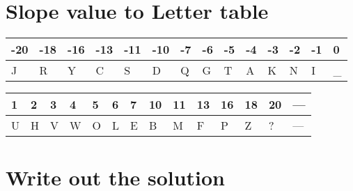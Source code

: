 \documentclass[12pt]{article}
\begin{document}
\section*{Slope value to Letter table}
\noindent %
\begin{tabularx}{\textwidth}{|*{14}{W|}} %
\hline
\textbf{-20} & \textbf{-18} & \textbf{-16} & \textbf{-13} & \textbf{-11} & \textbf{-10} & \textbf{-7} & \textbf{-6} & \textbf{-5} & \textbf{-4} & \textbf{-3} & \textbf{-2} & \textbf{-1} & \textbf{0} \\
\hline
J & R & Y & C & S & D & Q & G & T & A & K & N & I & \_ \\
\hline
\end{tabularx}

\vspace{1em} %

\noindent
\begin{tabularx}{\textwidth}{|*{14}{W|}} %
\hline
\textbf{1} & \textbf{2} & \textbf{3} & \textbf{4} & \textbf{5} & \textbf{6} & \textbf{7} & \textbf{10} & \textbf{11} & \textbf{13} & \textbf{16} & \textbf{18} & \textbf{20} & \textbf{---} \\
\hline
U & H & V & W & O & L & E & B & M & F & P & Z & ? & --- \\
\hline
\end{tabularx}

\section*{Write out the solution}
\end{document}
